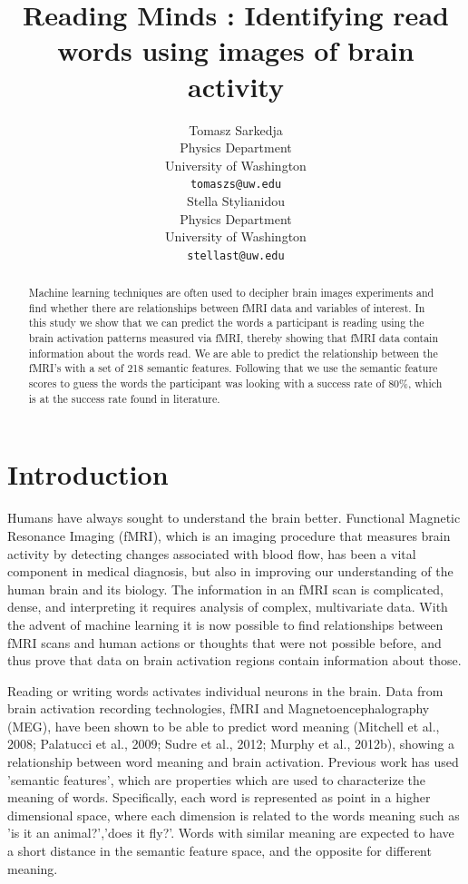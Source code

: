 \documentclass{article} %
\title{Reading Minds : Identifying read words using images of brain activity}
\author{
Tomasz Sarkedja \\
Physics Department\\
University of Washington\\
\texttt{tomaszs@uw.edu} \\
\And
Stella Stylianidou \\
Physics Department\\
University of Washington\\
\texttt{stellast@uw.edu} \\
}
\begin{document}
\maketitle

\begin{abstract}
Machine learning techniques are often used to decipher brain images experiments and find whether there are relationships between fMRI data and variables of interest. In this study we show that we can predict the words a participant is reading using the brain activation patterns measured via fMRI, thereby showing that fMRI data contain information about the words read. We are able to predict the relationship between the fMRI's with a set of 218 semantic features. Following that we use the semantic feature scores to guess the words the participant was looking with a success rate of 80\%, which is at the success rate found in literature. 

\end{abstract}

\section{Introduction}

Humans have always sought to understand the brain better. Functional Magnetic Resonance Imaging (fMRI), which is an imaging procedure that measures brain activity by detecting changes associated with blood flow, has been a vital component in medical diagnosis, but also in improving our understanding of the human brain and its biology. The information in an fMRI scan is complicated, dense, and interpreting it requires analysis of complex, multivariate data\cite{Pereira2009S199}. With the advent of machine learning it is now possible to find relationships between fMRI scans and human actions or thoughts that were not possible before, and thus prove that data on brain activation regions contain information about those.

Reading or writing words activates individual neurons in the brain. Data from brain activation recording technologies, fMRI and Magnetoencephalography (MEG), have been shown to be able to predict word meaning \cite{mitchell2008predicting} (Mitchell et al., 2008; Palatucci et al., 2009; Sudre et al., 2012; Murphy et al., 2012b), showing a relationship between word meaning and brain activation. Previous work \cite{mitchell2008predicting} has used 'semantic features', which are properties which are used to characterize the meaning of words. Specifically, each word is represented as point in a higher dimensional space, where each dimension is related to the words meaning such as 'is it an animal?','does it fly?'. Words with similar meaning are expected to have a short distance in the semantic feature space, and the opposite for different meaning. 
\end{document}
